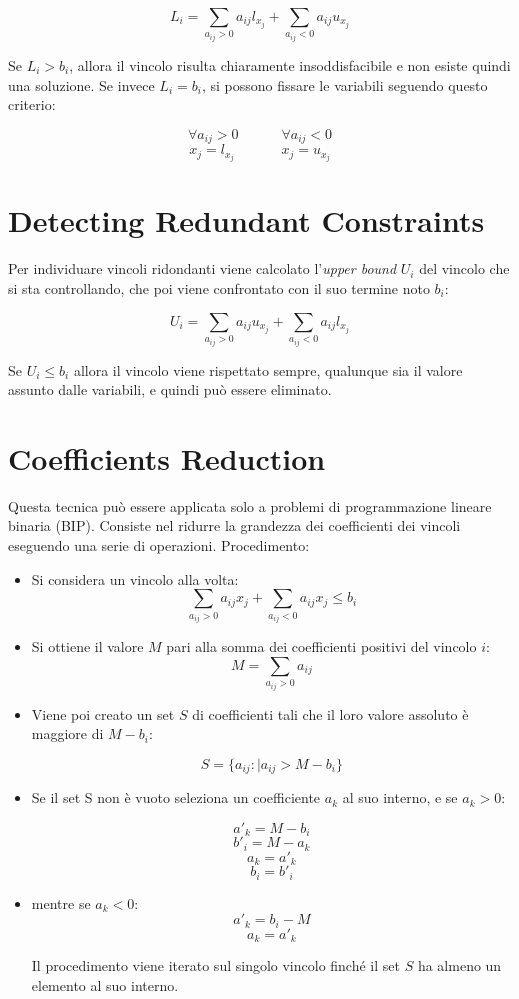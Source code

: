 \documentclass{article}
\begin{document}
\[
L_i = \sum_{a_{ij}>0}a_{ij} l_{x_{j}} + \sum_{a_{ij}<0}a_{ij} u_{x_{j}}
\]

Se $L_i>b_i$, allora il vincolo risulta chiaramente insoddisfacibile e non esiste quindi una soluzione.
\newline
Se invece $L_i=b_i$, si possono fissare le variabili seguendo questo criterio:

\[\forall a_{ij}>0 \;\;\;\;\;\;\;\;\;\;\;\forall a_{ij}<0 \]
\[x_j = l_{x_{j}} \;\;\;\;\;\;\;\;\;\;\;\; x_j = u_{x_{j}}\]

\section{Detecting Redundant Constraints}
Per individuare vincoli ridondanti viene calcolato l'\textit{upper bound} $U_i$ del vincolo che si sta controllando, che poi viene confrontato con il suo termine noto $b_i$:

\[
U_i = \sum_{a_{ij}>0}a_{ij} u_{x_{j}} + \sum_{a_{ij}<0}a_{ij} l_{x_{j}}
\]

Se $U_i \le b_i $ allora il vincolo viene rispettato sempre, qualunque sia il valore assunto dalle variabili, e quindi può essere eliminato. 

\section{Coefficients Reduction}

Questa tecnica può essere applicata solo a problemi di programmazione lineare binaria (BIP). Consiste nel ridurre la grandezza dei coefficienti dei vincoli eseguendo una serie di operazioni.
\newline
\newline
Procedimento:

\begin{itemize}
\item Si considera un vincolo alla volta:
\[\sum_{a_{ij}>0}a_{ij}x_{j} + \sum_{a_{ij}<0}a_{ij}x_{j} \le b_i \]
\item Si ottiene il valore $M$ pari alla somma dei coefficienti positivi del vincolo $i$:
\[M = \sum_{a_{ij}>0}a_{ij} \]

\item Viene poi creato un set $S$ di coefficienti tali che il loro valore assoluto è maggiore di $M-b_i$:

\[
S=\{a_{ij}:|a_{ij}>M-b_i\}
\]
\item Se il set S non è vuoto seleziona un coefficiente $a_k$ al suo interno, e se $a_k>0$:

\[a'_k = M - b_i \]
\[b'_i = M - a_k \]
\[a_k = a'_k\]
\[b_i = b'_i\]

\item mentre se $a_k<0$:
\[ a'_k = b_i - M \]
\[ a_k = a'_k \]

Il procedimento viene iterato sul singolo vincolo finché il set $S$ ha almeno un elemento al suo interno.

\end{itemize}
\end{document}
